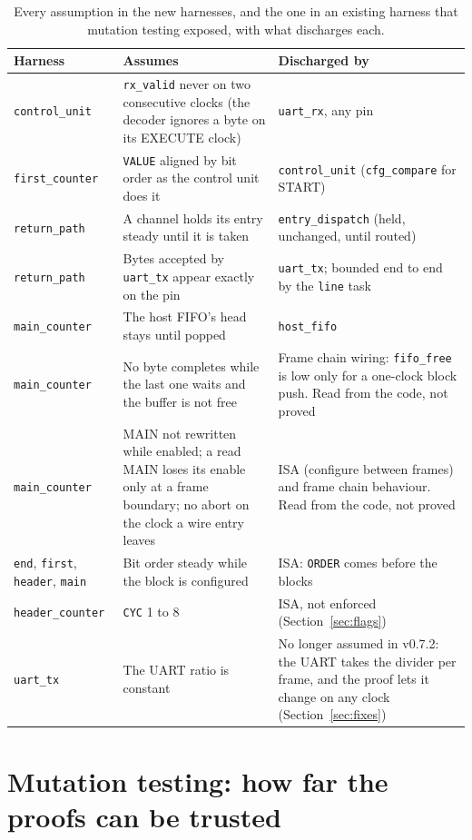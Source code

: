\documentclass[11pt,a4paper]{article}
\newcommand{\sig}[1]{\texttt{#1}}
\begin{document}
\begin{table}[h]
\centering\small
\begin{tabularx}{\linewidth}{@{}l L L@{}}
\toprule
Harness & Assumes & Discharged by \\
\midrule
\sig{control\_unit} & \sig{rx\_valid} never on two consecutive clocks (the decoder ignores a byte on its EXECUTE clock) & \sig{uart\_rx}, any pin \\
\sig{first\_counter} & \sig{VALUE} aligned by bit order as the control unit does it & \sig{control\_unit} (\sig{cfg\_compare} for START) \\
\sig{return\_path} & A channel holds its entry steady until it is taken & \sig{entry\_dispatch} (held, unchanged, until routed) \\
\sig{return\_path} & Bytes accepted by \sig{uart\_tx} appear exactly on the pin & \sig{uart\_tx}; bounded end to end by the \sig{line} task \\
\sig{main\_counter} & The host FIFO's head stays until popped & \sig{host\_fifo} \\
\sig{main\_counter} & No byte completes while the last one waits and the buffer is not free & Frame chain wiring: \sig{fifo\_free} is low only for a one-clock block push. Read from the code, not proved \\
\sig{main\_counter} & MAIN not rewritten while enabled; a read MAIN loses its enable only at a frame boundary; no abort on the clock a wire entry leaves & ISA (configure between frames) and frame chain behaviour. Read from the code, not proved \\
\sig{end}, \sig{first}, \sig{header}, \sig{main} & Bit order steady while the block is configured & ISA: \sig{ORDER} comes before the blocks \\
\sig{header\_counter} & \sig{CYC} 1 to 8 & ISA, not enforced (Section~\ref{sec:flags}) \\
\sig{uart\_tx} & The UART ratio is constant & No longer assumed in v0.7.2: the UART takes the divider per frame, and the proof lets it change on any clock (Section~\ref{sec:fixes}) \\
\bottomrule
\end{tabularx}
\caption{Every assumption in the new harnesses, and the one in an existing harness that mutation testing exposed, with what discharges each.}\label{tab:assume}
\end{table}

\section{Mutation testing: how far the proofs can be trusted}\label{sec:mutation}
\end{document}
